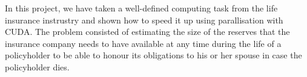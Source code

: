 In this project, we have taken a well-defined computing task from the life insurance instrustry and shown how to speed it up using parallisation with CUDA. The problem consisted of estimating the size of the reserves that the insurance company needs to have available at any time during the life of a policyholder to be able to honour its obligations to his or her spouse in case the policyholder dies.